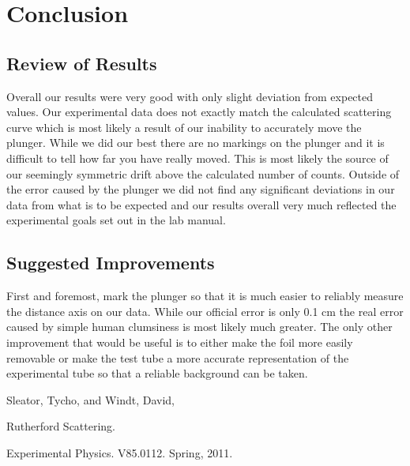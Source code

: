 \section{Conclusion}
\subsection{Review of Results}
\indent \indent Overall our results were very good with only slight deviation from expected values.  Our experimental data does not exactly match the calculated scattering curve which is most likely a result of our inability to accurately move the plunger.  While we did our best there are no markings on the plunger and it is difficult to tell how far you have really moved.  This is most likely the source of our seemingly symmetric drift above the calculated number of counts.
\indent \indent  Outside of the error caused by the plunger we did not find any significant deviations in our data from what is to be expected and our results overall very much reflected the experimental goals set out in the lab manual.

\subsection{Suggested Improvements}
\indent \indent First and foremost, mark the plunger so that it is much easier to reliably measure the distance axis on our data.  While our official error is only 0.1 cm the real error caused by simple human clumsiness is most likely much greater.  The only other improvement that would be useful is to either make the foil more easily removable or make the test tube a more accurate representation of the experimental tube so that a reliable background can be taken. 

\begin{thebibliography}{99}
Sleator, Tycho, and Windt, David, \begin{em}Rutherford Scattering. \end{em}Experimental Physics. V85.0112. Spring, 2011.
\end{thebibliography}


